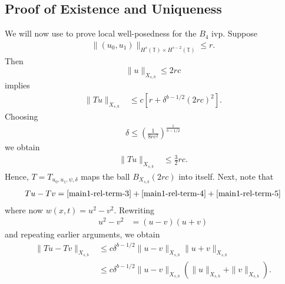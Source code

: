 \documentclass[12pt,reqno]{amsart}
\numberwithin{equation}{section}  %
\renewcommand{\cref}{\Cref}
\newcommand{\ci}{\mathbb{T}}
\begin{document}
\subsection{Proof of Existence and Uniqueness}
\label{sec:proof-b4-per-case}
%
%
%
%				 
%
We will now use \cref{prop:contraction} to prove local well-posedness for the 
$B_4$ ivp. Suppose
%
\begin{equation*}
	\begin{split}
    \|(u_0, u_{1})\|_{H^s(\ci) \times H^{s-2}(\ci)} \le r.
  \end{split}
\end{equation*}
%
Then $$\|u\|_{X_{s,b}} \le 2rc$$ implies
%
\begin{equation*}
	\begin{split}
		\|Tu \|_{X_{s,b}} 
    & \le c \left[ r + \delta^{b - 1/2} \left( 
		2rc \right)^2 \right].
	\end{split}
\end{equation*}
%
Choosing 
%
%
\begin{equation}
  \label{delta-suf-small}
\begin{split}
  \delta \le \left (\frac{1}{8rc^{2}} \right )^{\frac{1}{b - 1/2}}
\end{split}
\end{equation}
%
%
we obtain 
%
%
%
\begin{equation*}
\begin{split}
\|Tu \|_{X_{s,b}} 
    & \le \frac{3}{2}rc.
  \end{split}
\end{equation*}
%
%
Hence, $T=T_{u_0, u_1, \psi, \delta}$ maps the ball $B_{X_{s,b}}(2rc)$ into
itself. Next, note that 
%
\begin{equation*}
	\begin{split}
    Tu - Tv = \cref{main1-rel-term-3} + \cref{main1-rel-term-4} +
    \cref{main1-rel-term-5} 
  \end{split}
  \label{eqn:integral-form-dif}
\end{equation*}
%
where now $w(x,t) =u^{2} - v^{2}$. Rewriting
%
\begin{equation*}
	\begin{split}
	u^2 - v^2
		& = (u-v)(u+v)
		\end{split}
\end{equation*}
%
and repeating earlier arguments, we obtain
%
\begin{equation}
	\label{20a}
	\begin{split}
		\|Tu - Tv \|_{X_{s,b}}  
    & \le c \delta^{b - 1/2}\|u -v\|_{X_{s,b}} \|u + v \|_{X_{s,b}}
		\\
    & \le c \delta^{b -1/2} \|u -v\|_{X_{s,b}} (\|u\|_{X_{s,b}}+ \|v \|_{X_{s,b}}).
	\end{split}
\end{equation}
\end{document}
